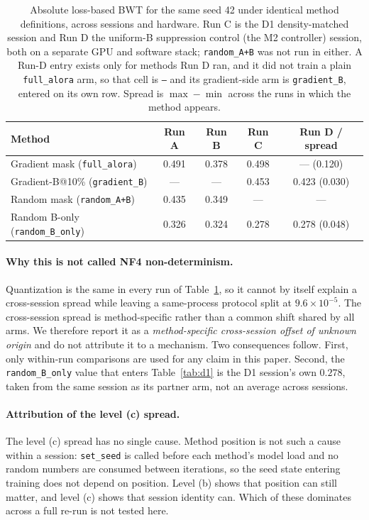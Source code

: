 \begin{table}[h]
\caption{Absolute loss-based BWT for the same seed 42 under identical method
definitions, across sessions and hardware. Run C is the D1 density-matched
session and Run D the uniform-B suppression control (the M2 controller) session, both on a separate GPU and software
stack; \texttt{random\_A+B} was not run in either. A Run-D entry exists only for
methods Run D ran, and it did not train a plain \texttt{full\_alora} arm, so that
cell is \texttt{---} and its gradient-side arm is \texttt{gradient\_B}, entered on
its own row. Spread is $\max-\min$ across the runs in which the method appears.}
\label{tab:nf4_drift}
\centering
\small
\begin{tabular}{@{}lcccc@{}}
\toprule
\textbf{Method} & \textbf{Run A} & \textbf{Run B} & \textbf{Run C} & \textbf{Run D / spread} \\
\midrule
Gradient mask (\texttt{full\_alora}) & 0.491 & 0.378 & 0.498 & --- (0.120) \\
Gradient-B@10\% (\texttt{gradient\_B}) & --- & --- & 0.453 & 0.423 (0.030) \\
Random mask (\texttt{random\_A+B}) & 0.435 & 0.349 & --- & --- \\
Random B-only (\texttt{random\_B\_only}) & 0.326 & 0.324 & 0.278 & 0.278 (0.048) \\
\bottomrule
\end{tabular}
\end{table}

\paragraph{Why this is not called NF4 non-determinism.} Quantization is the same
in every run of Table~\ref{tab:nf4_drift}, so it cannot by itself explain a
cross-session spread while leaving a same-process protocol split at
$9.6\times10^{-5}$. The cross-session spread is method-specific rather than a
common shift shared by all arms. We therefore report it as a \emph{method-specific
cross-session offset of unknown origin} and do not
attribute it to a mechanism. Two consequences follow. First, only within-run
comparisons are used for any claim in this paper. Second, the \texttt{random\_B\_only}
value that enters Table~\ref{tab:d1} is the D1 session's own $0.278$, taken from the
same session as its partner arm, not an average across sessions.

\paragraph{Attribution of the level (c) spread.} The level (c) spread has no single
cause. Method position is not such a cause within a session:
\texttt{set\_seed} is called before each method's model load and no random numbers
are consumed between iterations, so the seed state entering training does not
depend on position. Level (b) shows that position can still matter, and level
(c) shows that session identity can. Which of these dominates across a full
re-run is not tested here.

